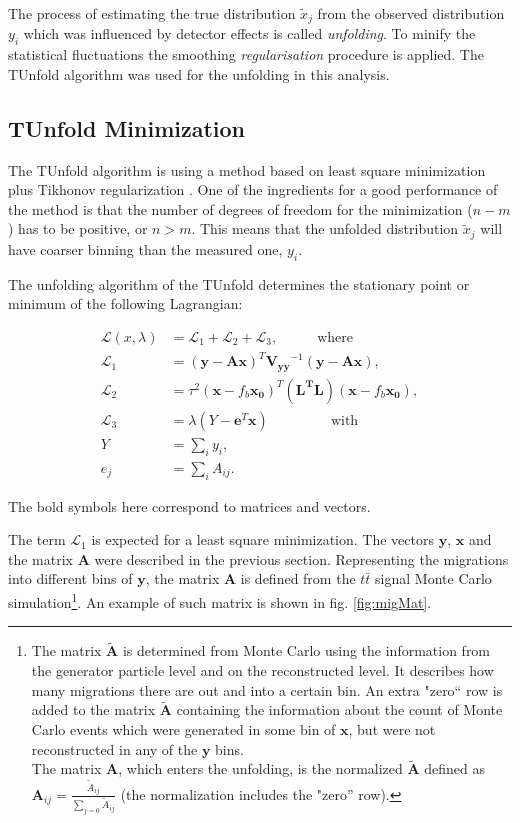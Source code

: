 The process of estimating the true distribution $\tilde{x}_{j}$ from the observed distribution $y_{i}$ which was influenced
by detector effects is called \textit{unfolding}. To minify the statistical fluctuations the smoothing  
\textit{regularisation} procedure is applied. The TUnfold \cite{Schmitt:2012kp} algorithm was used for the
unfolding in this analysis.

\subsection{TUnfold Minimization}\label{ssec:TUmini}

The TUnfold algorithm is using a method based on least square minimization plus Tikhonov regularization \cite{Tikhonov:1963}. One of the ingredients 
for a good performance of the method is that the number of degrees of freedom for the minimization ($n - m$) has to be positive,
or $n > m$. This means that the unfolded distribution $\tilde{x}_j$ will have coarser binning than the measured one, $y_{i}$.

The unfolding algorithm of the TUnfold determines the stationary point or minimum of the following Lagrangian:

\begin{align}
 \mathcal{L}(x, \lambda) & = \mathcal{L}_{1} + \mathcal{L}_{2} + \mathcal{L}_{3}, \;\;\;\;\;\;\;\;\;\; \textrm{where}\\
 \mathcal{L}_{1} & = (\mathbf{y} - \mathbf{A}\mathbf{x})^{T} \mathbf{V_{yy}}^{-1}(\mathbf{y} - \mathbf{A}\mathbf{x}),\\
 \mathcal{L}_{2} & = \tau^{2}(\mathbf{x} - f_{b}\mathbf{x_{0}})^{T} (\mathbf{L^{T}L}) (\mathbf{x} - f_{b}\mathbf{x_{0}}), \\
 \mathcal{L}_{3} & = \lambda(Y -\mathbf{e}^{T}\mathbf{x}) \;\;\;\;\;\;\;\;\;\;\;\;\;\;\;\; \textrm{with} \\
 Y & = \sum_{i} y_{i}, \\
 e_{j} & = \sum_{i} A_{ij}.
\end{align}

The bold symbols here correspond to matrices and vectors.

The term $\mathcal{L}_{1}$ is expected for a least square minimization. The vectors $\mathbf{y}$, $\mathbf{x}$ and the matrix $\mathbf{A}$ were
described in the previous section. Representing the migrations into different bins of $\mathbf{y}$, the matrix $\mathbf{A}$
is defined from the $t\bar{t}$ signal Monte Carlo simulation\footnote{The matrix $\mathbf{\tilde{A}}$ is
determined from Monte Carlo using the information from the generator particle level and on the reconstructed level. It describes how many 
migrations there are out and into a certain bin. An extra "zero`` row is added
to the matrix $\mathbf{\tilde{A}}$ containing the information about the count of Monte Carlo events which were generated in some bin of $\mathbf{x}$,
but were not reconstructed in any of the $\mathbf{y}$ bins. \\ The matrix $\mathbf{A}$, which enters the unfolding, is the normalized $\mathbf{\tilde{A}}$
defined as $\mathbf{A}_{ij} = \frac{\tilde{A}_{ij}}{\sum_{j=0}\tilde{A}_{ij}}$ (the normalization includes the "zero'' row).}. An example of such matrix 
is shown in fig. \ref{fig:migMat}. 


